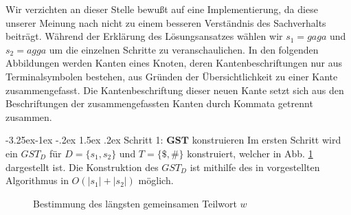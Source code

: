 \documentclass[12pt]{report}
\makeatletter
\renewcommand\paragraph{\@startsection{paragraph}{4}{\z@}%
    {-3.25ex\@plus -1ex \@minus -.2ex}%
    {1.5ex \@plus .2ex}%
    {\normalfont\normalsize\bfseries}}
\newcommand{\abs}[1]{\left|#1\right|}
\makeatother
\begin{document}
Wir verzichten an dieser Stelle bewußt auf eine Implementierung, da diese unserer Meinung nach nicht zu einem besseren Verständnis des Sachverhalts beiträgt. Während der Erklärung des Lösungsansatzes wählen wir $s_1 = gaga$ und $s_2 = agga$ um die einzelnen Schritte zu veranschaulichen. In den folgenden Abbildungen werden Kanten eines Knoten, deren Kantenbeschriftungen nur aus Terminalsymbolen bestehen, aus Gründen der Übersichtlichkeit zu einer Kante zusammengefasst. Die Kantenbeschriftung dieser neuen Kante setzt sich aus den Beschriftungen der zusammengefassten Kanten durch Kommata getrennt zusammen.

\paragraph{Schritt 1: $\boldsymbol{GST}$ konstruieren}
Im ersten Schritt wird ein $GST_D$ für $D = \{s_1, s_2\}$ und $T = \{\$, \#\}$ konstruiert, welcher in Abb. \ref{fig:BestimmungDesLaengstesGemeinsamesTeilwortW} dargestellt ist. Die Konstruktion des $GST_D$ ist mithilfe des in \cite{Ukkonen1995} vorgestellten Algorithmus in $O(\abs{s_1} + \abs{s_2})$ möglich.

\begin{figure}[htb]
\centering
{}
\caption{Bestimmung des längsten gemeinsamen Teilwort $w$}
\label{fig:BestimmungDesLaengstesGemeinsamesTeilwortW}
\end{figure}
\end{document}

